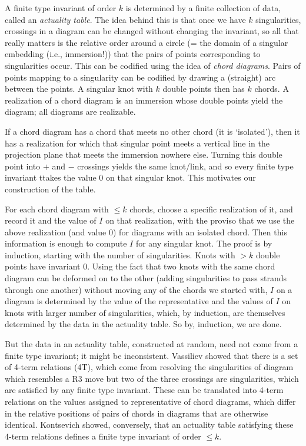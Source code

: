 \ssk

A finite type invariant of order $k$
is determined by a finite collection of data, called an 
{\it actuality table}. The idea behind this is that once
we have $k$ singularities, crossings in a diagram can be changed  
without changing the invariant, so all that really matters is the
relative order around a circle (= the domain of
a singular embedding (i.e., immersion!)) that the pairs of points
corresponding to singularities occur. This can be codified using the
idea of {\it chord diagrams}. Pairs of points mapping to a singularity
can be codified by drawing a (straight) arc between the points. A
singular knot with $k$ double points then has $k$ chords. A realization
of a chord diagram is an immersion whose double points yield the
diagram; all diagrams are realizable. 

\ssk

If a chord diagram has a
chord that meets no other chord (it is `isolated'), then it has a realization for 
which that singular point meets a vertical line in the projection plane
that meets the immersion nowhere else. Turning this double 
point into $+$ and $-$ crossings yields the same knot/link, and
so every finite type invariant ttakes the value $0$ on that
singular knot. This motivates our construction of the table.

\ssk

For each chord diagram with $\leq k$ chords, choose a specific 
realization of it, and record it and the value of $I$ on that
realization, with the proviso that we use the 
above realization (and value $0$) for diagrams with an isolated 
chord. Then this information is enough to compute $I$ for
any singular knot. The proof is by induction, starting with the
 number of singularities. Knots with $>k$ 
double points have invariant $0$. Using the fact that 
two knots with the same chord diagram can be deformed on to the 
other (adding singularities to pass strands through one
another) without moving any of the chords we started with,
$I$ on a diagram is determined by the value of the representative 
and the values of $I$ on knots with larger number of singularities,
which, by induction, are themselves determined by the data
in the actuality table. So by, induction, we are done.

\ssk

But the data in an actuality table, constructed at random, need not come
from a finite type invariant; it might be inconsistent. Vassiliev
showed that there is a set of 4-term relations (4T), which come from
resolving the singularities of diagram which resembles a R3 move
but two of the three crossings are singularities, which are satisfied
by any finite type invariant. These can be translated into 4-term
relations on the values assigned
to representative of chord diagrams, which differ in the relative positions of 
pairs of chords in diagrams that are otherwise identical. 
Kontsevich showed, conversely, that an actuality table satisfying
these 4-term relations defines a finite type invariant of order $\leq k$.

